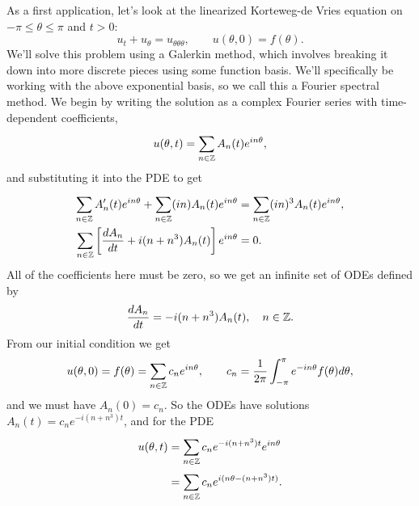 \documentclass[../m180main.tex]{subfiles}
\begin{document}
As a first application, let's look at the linearized Korteweg-de Vries equation on $-\pi \leq \theta \leq \pi$ and $t > 0$:
\[ u_t + u_\theta = u_{\theta\theta\theta}, \qquad u(\theta,0) = f(\theta). \]
We'll solve this problem using a Galerkin method, which involves breaking it down into more discrete pieces using some function basis.
We'll specifically be working with the above exponential basis, so we call this a Fourier spectral method.
We begin by writing the solution as a complex Fourier series with time-dependent coefficients,
\[ u(\theta, t) = \sum_{n \in \mathbb{Z}}^{} A_n(t) e^{in\theta}, \]
and substituting it into the PDE to get
\begin{align*}
    \sum_{n \in \mathbb{Z}}^{} A_n'(t) e^{in\theta} + \sum_{n \in \mathbb{Z}}^{} (in) A_n(t) e^{in\theta} &= \sum_{n \in \mathbb{Z}}^{} (in)^3 A_n(t) e^{in\theta}, \\
    \sum_{n \in \mathbb{Z}}^{} \left[ \frac{dA_n}{dt} + i(n + n^3) A_n(t) \right] e^{in\theta} &= 0.
\end{align*}
All of the coefficients here must be zero, so we get an infinite set of ODEs defined by
\[ \frac{dA_n}{dt} = -i(n+n^3) A_n(t) ,\quad n \in \mathbb{Z}. \]
From our initial condition we get
\[ u(\theta,0) = f(\theta) = \sum_{n \in \mathbb{Z}}^{} c_n e^{in\theta}, \qquad c_n = \frac{1}{2\pi} \int_{-\pi}^{\pi} e^{-in\theta} f(\theta) d\theta, \]
and we must have $A_n(0) = c_n$.
So the ODEs have solutions $A_n(t) = c_n e^{-i(n+n^3)t}$, and for the PDE
\begin{align*}
    u(\theta,t) &= \sum_{n \in \mathbb{Z}}^{} c_n e^{-i(n+n^3)t} e^{in\theta} \\
    &= \sum_{n \in \mathbb{Z}}^{} c_n e^{i(n\theta - (n + n^3)t)}.
\end{align*}
\end{document}
